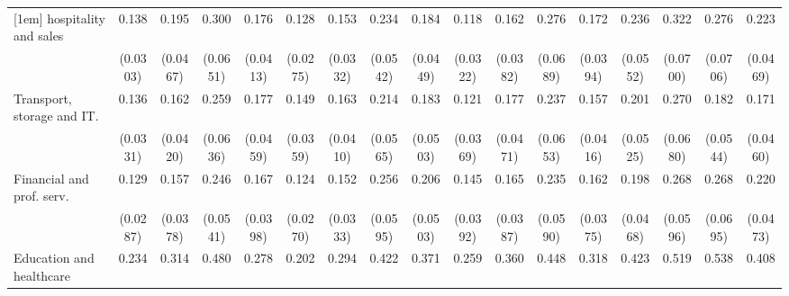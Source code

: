 {\begin{tabular}{l*{16}{c}}
[1em]
hospitality and sales&       0.138\sym{***}&       0.195\sym{***}&       0.300\sym{***}&       0.176\sym{***}&       0.128\sym{***}&       0.153\sym{***}&       0.234\sym{***}&       0.184\sym{***}&       0.118\sym{***}&       0.162\sym{***}&       0.276\sym{***}&       0.172\sym{***}&       0.236\sym{***}&       0.322\sym{***}&       0.276\sym{***}&       0.223\sym{***}\\
                    &    (0.0303)         &    (0.0467)         &    (0.0651)         &    (0.0413)         &    (0.0275)         &    (0.0332)         &    (0.0542)         &    (0.0449)         &    (0.0322)         &    (0.0382)         &    (0.0689)         &    (0.0394)         &    (0.0552)         &    (0.0700)         &    (0.0706)         &    (0.0469)         \\
[1em]
Transport, storage and IT.&       0.136\sym{***}&       0.162\sym{***}&       0.259\sym{***}&       0.177\sym{***}&       0.149\sym{***}&       0.163\sym{***}&       0.214\sym{***}&       0.183\sym{***}&       0.121\sym{***}&       0.177\sym{***}&       0.237\sym{***}&       0.157\sym{***}&       0.201\sym{***}&       0.270\sym{***}&       0.182\sym{***}&       0.171\sym{***}\\
                    &    (0.0331)         &    (0.0420)         &    (0.0636)         &    (0.0459)         &    (0.0359)         &    (0.0410)         &    (0.0565)         &    (0.0503)         &    (0.0369)         &    (0.0471)         &    (0.0653)         &    (0.0416)         &    (0.0525)         &    (0.0680)         &    (0.0544)         &    (0.0460)         \\
[1em]
Financial and prof. serv.&       0.129\sym{***}&       0.157\sym{***}&       0.246\sym{***}&       0.167\sym{***}&       0.124\sym{***}&       0.152\sym{***}&       0.256\sym{***}&       0.206\sym{***}&       0.145\sym{***}&       0.165\sym{***}&       0.235\sym{***}&       0.162\sym{***}&       0.198\sym{***}&       0.268\sym{***}&       0.268\sym{***}&       0.220\sym{***}\\
                    &    (0.0287)         &    (0.0378)         &    (0.0541)         &    (0.0398)         &    (0.0270)         &    (0.0333)         &    (0.0595)         &    (0.0503)         &    (0.0392)         &    (0.0387)         &    (0.0590)         &    (0.0375)         &    (0.0468)         &    (0.0596)         &    (0.0695)         &    (0.0473)         \\
[1em]
Education and healthcare&       0.234\sym{***}&       0.314\sym{***}&       0.480\sym{***}&       0.278\sym{***}&       0.202\sym{***}&       0.294\sym{***}&       0.422\sym{***}&       0.371\sym{***}&       0.259\sym{***}&       0.360\sym{***}&       0.448\sym{**} &       0.318\sym{***}&       0.423\sym{***}&       0.519\sym{**} &       0.538\sym{*}  &       0.408\sym{***}\\

\end{tabular}}
